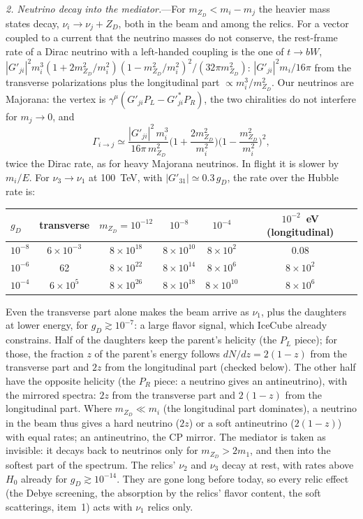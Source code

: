 \documentclass[11pt,a4paper]{article}
\newcommand{\mzd}{m_{Z_D}}
\newcommand{\gd}{g_D}
\begin{document}
\textit{2. Neutrino decay into the mediator.}---For $\mzd < m_i - m_j$ the heavier mass states decay,
$\nu_i \to \nu_j + Z_D$, both in the beam and among the relics. For a vector coupled to a current that the neutrino
masses do not conserve, the rest-frame rate of a Dirac neutrino with a left-handed coupling is the one of $t \to bW$,
$|G'_{ji}|^2 m_i^3 (1 + 2\mzd^2/m_i^2)(1 - \mzd^2/m_i^2)^2/(32\pi\mzd^2)$: $|G'_{ji}|^2 m_i/16\pi$ from the transverse
polarizations plus the longitudinal part $\propto m_i^3/\mzd^2$. Our neutrinos are Majorana: the vertex is
$\gamma^\mu(G'_{ji}P_L - G'^*_{ji}P_R)$, the two chiralities do not interfere for $m_j \to 0$, and
\begin{equation}
  \Gamma_{i\to j} \simeq \frac{|G'_{ji}|^2\,m_i^3}{16\pi\,\mzd^2}\Big(1 + \frac{2\mzd^2}{m_i^2}\Big)
  \Big(1 - \frac{\mzd^2}{m_i^2}\Big)^2 ,
\end{equation}
twice the Dirac rate, as for heavy Majorana neutrinos. In flight it is slower by $m_i/E$. For $\nu_3\to\nu_1$ at
100~TeV, with $|G'_{31}| \simeq 0.3\,\gd$, the rate over the Hubble rate is:
\begin{center}
\begin{tabular}{lccccc}
  $\gd$ & transverse & $\mzd = 10^{-12}$ & $10^{-8}$ & $10^{-4}$ & $10^{-2}$~eV (longitudinal) \\ \hline
  $10^{-8}$ & $6\times10^{-3}$ & $8\times10^{18}$ & $8\times10^{10}$ & $8\times10^{2}$ & 0.08 \\
  $10^{-6}$ & 62 & $8\times10^{22}$ & $8\times10^{14}$ & $8\times10^{6}$ & $8\times10^{2}$ \\
  $10^{-4}$ & $6\times10^{5}$ & $8\times10^{26}$ & $8\times10^{18}$ & $8\times10^{10}$ & $8\times10^{6}$ \\
\end{tabular}
\end{center}
Even the transverse part alone makes the beam arrive as $\nu_1$, plus the daughters at lower energy, for
$\gd \gtrsim 10^{-7}$: a large flavor signal, which IceCube already constrains. Half of the daughters keep the
parent's helicity (the $P_L$ piece); for those, the fraction $z$ of the parent's energy follows $dN/dz = 2(1-z)$
from the transverse part and $2z$ from the longitudinal part (checked below). The other half have the opposite
helicity (the $P_R$ piece: a neutrino gives an antineutrino), with the mirrored spectra: $2z$ from the transverse part
and $2(1-z)$ from the longitudinal part. Where $\mzd \ll m_i$ (the longitudinal part dominates), a neutrino in the
beam thus gives a hard neutrino ($2z$) or a soft antineutrino ($2(1-z)$) with equal rates; an antineutrino, the
CP mirror. The mediator is taken as invisible: it decays back to neutrinos only for $\mzd > 2m_1$, and then into
the softest part of the spectrum. The relics' $\nu_2$ and $\nu_3$ decay at rest, with rates above $H_0$ already for
$\gd \gtrsim 10^{-14}$. They are gone long before today, so every relic effect (the Debye screening, the absorption
by the relics' flavor content, the soft scatterings, item~1) acts with $\nu_1$ relics only.
\end{document}
